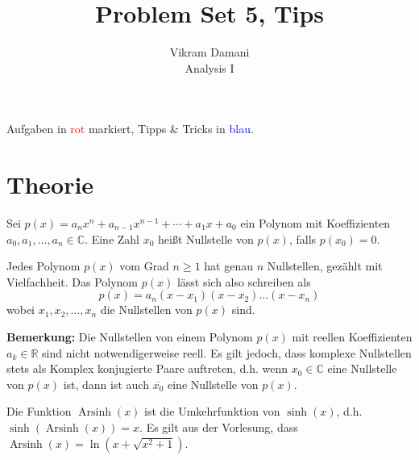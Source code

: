 \documentclass[12pt]{article}
\DeclareMathOperator{\arcsinh}{Arsinh}
\newcommand{\R}{\mathbb{R}} %
\newcommand{\C}{\mathbb{C}}
\newenvironment{definition}[2][Definition]{\begin{trivlist}
        \item[\hskip \labelsep {\bfseries #1}\hskip \labelsep {\bfseries #2.}]}{\flushright{$\square$}\end{trivlist}}
\newenvironment{remark}[2][Bemerkung]{\begin{trivlist}
        \item[\hskip \labelsep {\bfseries #1}\hskip \labelsep {\bfseries #2.}]}{\end{trivlist}}
\begin{document}
\title{Problem Set 5, Tips}
\author{Vikram Damani\\
    Analysis I}

\maketitle
Aufgaben in \textcolor{red}{rot} markiert, Tipps \& Tricks in \textcolor{blue}{blau}.

\section{Theorie}

\begin{definition}{[Fundamentalsatz der Algebra]}
    Sei $p(x)=a_n x^n+a_{n-1}x^{n-1}+ \cdots +a_1x+a_0$ ein Polynom mit Koeffizienten $a_0,a_1,\ldots,a_n\in\C$. Eine Zahl $x_0$ heißt Nullstelle von $p(x)$, falls $p(x_0)=0$.

    Jedes Polynom $p(x)$ vom Grad $n\geq 1$ hat genau $n$ Nullstellen, gezählt mit Vielfachheit. Das Polynom $p(x)$ lässt sich also schreiben als
    \begin{equation}
        p(x)=a_n(x-x_1)(x-x_2)\ldots(x-x_n)
    \end{equation}
    wobei $x_1,x_2,\ldots,x_n$ die Nullstellen von $p(x)$ sind.

    \textbf{Bemerkung:} Die Nullstellen von einem Polynom $p(x)$ mit reellen Koeffizienten $a_k\in\R$ sind nicht notwendigerweise reell. Es gilt jedoch, dass komplexe Nullstellen stets als Komplex konjugierte Paare auftreten, d.h. wenn $x_0\in\C$ eine Nullstelle von $p(x)$ ist, dann ist auch $\overline{x_0}$ eine Nullstelle von $p(x)$.
\end{definition}

\begin{remark}{[$\arcsinh$]}
    Die Funktion $\arcsinh(x)$ ist die Umkehrfunktion von $\sinh(x)$, d.h. $\sinh(\arcsinh(x))=x$.
    Es gilt aus der Vorlesung, dass $\arcsinh(x) = \ln(x + \sqrt{x^2 + 1})$.
\end{remark}
\end{document}
